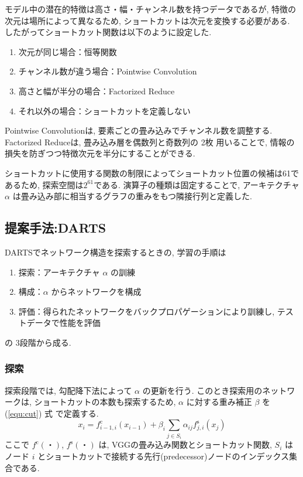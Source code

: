 モデル中の潜在的特徴は高さ・幅・チャンネル数を持つデータであるが,
特徴の次元は場所によって異なるため, ショートカットは次元を変換する必要がある.
したがってショートカット関数は以下のように設定した.
\begin{enumerate}
  \item 次元が同じ場合：恒等関数
  \item チャンネル数が違う場合：Pointwise Convolution
  \item 高さと幅が半分の場合：Factorized Reduce
  \item それ以外の場合：ショートカットを定義しない
\end{enumerate}
Pointwise Convolutionは, 要素ごとの畳み込みでチャンネル数を調整する.
Factorized Reduceは, 畳み込み層を偶数列と奇数列の 2枚 用いることで, 情報の損失を防ぎつつ特徴次元を半分にすることができる.

ショートカットに使用する関数の制限によってショートカット位置の候補は61であるため,
探索空間は$2^{61}$である.
演算子の種類は固定することで, アーキテクチャ $\alpha$ は畳み込み部に相当するグラフの重みをもつ隣接行列と定義した.


\changeindent{0cm}
\subsection{提案手法:DARTS}
\label{sec:pred.01}
\changeindent{2cm}

DARTSでネットワーク構造を探索するときの, 学習の手順は
\begin{enumerate}
  \item 探索：アーキテクチャ $\alpha$ の訓練
  \item 構成：$\alpha$ からネットワークを構成
  \item 評価：得られたネットワークをバックプロパゲーションにより訓練し, テストデータで性能を評価
\end{enumerate}
の 3段階から成る.

\subsubsection{探索}

探索段階では, 勾配降下法によって $\alpha$ の更新を行う.
このとき探索用のネットワークは, ショートカットの本数も探索するため,
$\alpha$ に対する重み補正 $\beta$ を (\ref{equ:cut}) 式 で定義する.
\begin{equation}
  \label{equ:cut}
  x_i = f^{\mathrm{c}}_{i-1, i}(x_{i-1}) + \beta_i \sum_{j \in S_i} \alpha_{ij} f^{\mathrm{s}}_{j, i} (x_j)
\end{equation}
ここで $f^{\mathrm{c}}(・)$, $f^{\mathrm{s}}(・)$ は, VGGの畳み込み関数とショートカット関数,
$S_i$ はノード $i$ とショートカットで接続する先行(predecessor)ノードのインデックス集合である.

